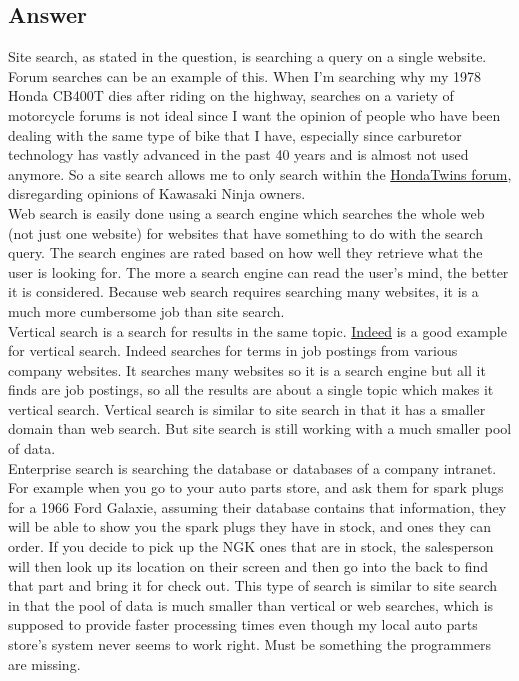 \documentclass[10pt,letterpaper,bibliography=totocnumbered]{scrartcl}
\begin{document}
\subsection{Answer}
Site search, as stated in the question, is searching a query on a single website. Forum searches can be an example of this. When I'm searching why my 1978 Honda CB400T dies after riding on the highway, searches on a variety of motorcycle forums is not ideal since I want the opinion of people who have been dealing with the same type of bike that I have, especially since carburetor technology has vastly advanced in the past 40 years and is almost not used anymore. So a site search allows me to only search within the \href{www.hondatwins.net}{HondaTwins forum}, disregarding opinions of Kawasaki Ninja owners.\\

Web search is easily done using a search engine which searches the whole web (not just one website) for websites that have something to do with the search query. The search engines are rated based on how well they retrieve what the user is looking for. The more a search engine can read the user's mind, the better it is considered. Because web search requires searching many websites, it is a much more cumbersome job than site search. \\

Vertical search is a search for results in the same topic. \href{www.indeed.com}{Indeed} is a good example for vertical search. Indeed searches for terms in job postings from various company websites. It searches many websites so it is a search engine but all it finds are job postings, so all the results are about a single topic which makes it vertical search. Vertical search is similar to site search in that it has a smaller domain than web search. But site search is still working with a much smaller pool of data. \\

Enterprise search is searching the database or databases of a company intranet. For example when you go to your auto parts store, and ask them for spark plugs for a 1966 Ford Galaxie, assuming their database contains that information, they will be able to show you the spark plugs they have in stock, and ones they can order. If you decide to pick up the NGK ones that are in stock, the salesperson will then look up its location on their screen and then go into the back to find that part and bring it for check out. This type of search is similar to site search in that the pool of data is much smaller than vertical or web searches, which is supposed to provide faster processing times even though my local auto parts store's system never seems to work right. Must be something the programmers are missing.
\end{document}
